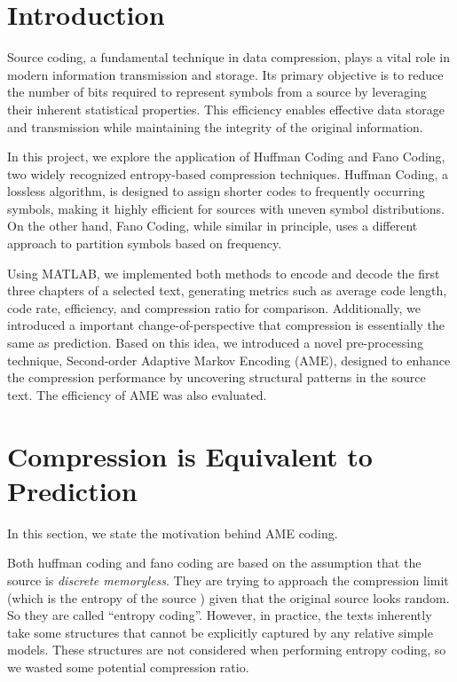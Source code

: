 \documentclass[12pt,twoside]{article}
\begin{document}
\section{Introduction}

Source coding, a fundamental technique in data compression, plays a vital role in modern information transmission and storage. Its primary objective is to reduce the number of bits required to represent symbols from a source by leveraging their inherent statistical properties. This efficiency enables effective data storage and transmission while maintaining the integrity of the original information.

In this project, we explore the application of Huffman Coding and Fano Coding, two widely recognized entropy-based compression techniques. Huffman Coding, a lossless algorithm, is designed to assign shorter codes to frequently occurring symbols, making it highly efficient for sources with uneven symbol distributions. On the other hand, Fano Coding, while similar in principle, uses a different approach to partition symbols based on frequency.

Using MATLAB, we implemented both methods to encode and decode the first three chapters of a selected text, generating metrics such as average code length, code rate, efficiency, and compression ratio for comparison. Additionally, we introduced a important change-of-perspective that compression is essentially the same as prediction. Based on this idea, we introduced a novel pre-processing technique, Second-order Adaptive Markov Encoding (AME), designed to enhance the compression performance by uncovering structural patterns in the source text. The efficiency of AME was also evaluated.


\section{Compression is Equivalent to Prediction}

In this section, we state the motivation behind AME coding. 

Both huffman coding and fano coding are based on the assumption that the source is \textit{discrete memoryless}. They are trying to approach the compression limit (which is the entropy of the source \cite{ref1}) given that the original source looks random. So they are called ``entropy coding''. However, in practice, the texts inherently take some structures that cannot be explicitly captured by any relative simple models. These structures are not considered when performing entropy coding, so we wasted some potential compression ratio.
\end{document}
